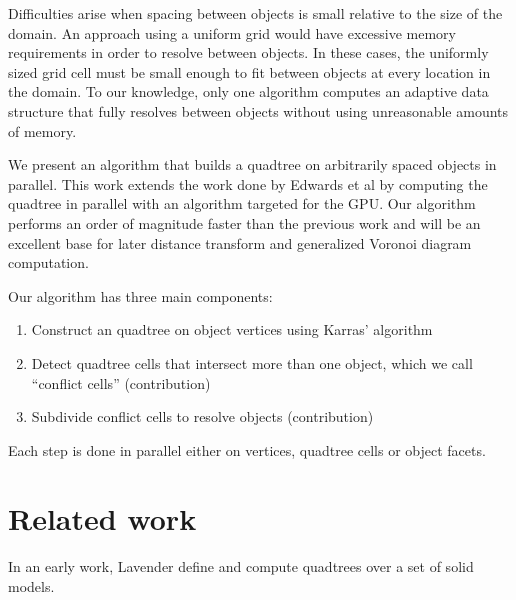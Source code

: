 \documentclass[submission]{gmp2017}
\begin{document}
Difficulties arise when spacing between objects is small relative to the size of the domain. An approach using a uniform grid would have excessive memory requirements in order to resolve between objects.  In these cases, the uniformly sized grid cell must be small enough to fit between objects at every location in the domain. To our knowledge, only one algorithm \cite{edwards2015approximating} computes an adaptive data structure that fully resolves between objects without using unreasonable amounts of memory.

We present an algorithm that builds a quadtree on arbitrarily spaced objects in parallel. This work extends the work done by Edwards et al \cite{edwards2015approximating} by computing the quadtree in parallel with an algorithm targeted for the GPU. Our algorithm performs an order of magnitude faster than the previous work and will be an excellent base for later distance transform and generalized Voronoi diagram computation.

Our algorithm has three main components:

\begin{enumerate}
\item Construct an quadtree on object vertices using Karras' algorithm \cite{karras2012maximizing}
\item Detect quadtree cells that intersect more than one object, which we call ``conflict cells'' (contribution)
\item Subdivide conflict cells to resolve objects (contribution)
\end{enumerate}

Each step is done in parallel either on vertices, quadtree cells or object facets.

\section{Related work}
In an early work, Lavender \etal {} define and compute quadtrees over a set of solid models. 
\end{document}
